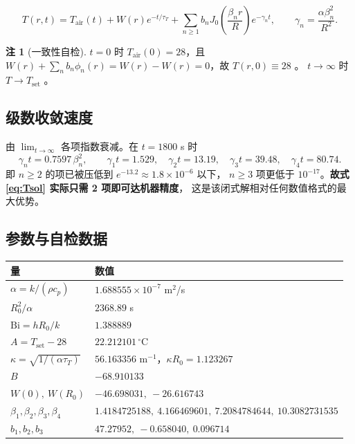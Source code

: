 \documentclass[11pt,a4paper]{article}
\theoremstyle{definition}
\newtheorem{remark}{注}
\begin{document}
\begin{equation}
\boxed{\;
T(r,t)=T_{\mathrm{air}}(t)+W(r)e^{-t/\tau_T}
+\sum_{n\ge1}b_nJ_0\!\left(\frac{\beta_n r}{R}\right)e^{-\gamma_nt},
\qquad \gamma_n=\frac{\alpha\beta_n^2}{R^2}.
\;}
\label{eq:Tsol}
\end{equation}

\begin{remark}[一致性自检]
$t=0$ 时 $T_{\mathrm{air}}(0)=28$，且
$W(r)+\sum_nb_n\phi_n(r)=W(r)-W(r)=0$，故 $T(r,0)\equiv28$ \checkmark。
$t\to\infty$ 时 $T\to T_{\mathrm{set}}$ \checkmark。
\end{remark}

\subsection{级数收敛速度}

由 $\lim_{t\to\infty}$ 各项指数衰减。在 $t=1800$ s 时
\[
\gamma_nt=0.7597\,\beta_n^2,\qquad
\gamma_1t=1.529,\quad\gamma_2t=13.19,\quad\gamma_3t=39.48,\quad\gamma_4t=80.74 .
\]
即 $n\ge2$ 的项已被压低到 $e^{-13.2}\approx1.8\times10^{-6}$ 以下，
$n\ge3$ 项更低于 $10^{-17}$。\textbf{故式 \eqref{eq:Tsol} 实际只需 2 项即可达机器精度}，
这是该闭式解相对任何数值格式的最大优势。

\subsection{参数与自检数据}

\begin{center}
\small
\begin{tabular}{@{}ll@{}}
\toprule
量 & 数值 \\
\midrule
$\alpha=k/(\rho c_p)$ & $1.688555\times10^{-7}$ m$^2$/s \\
$R_0^2/\alpha$ & $2368.89$ s \\
$\mathrm{Bi}=hR_0/k$ & $1.388889$ \\
$A=T_{\mathrm{set}}-28$ & $22.212101\,^\circ$C \\
$\kappa=\sqrt{1/(\alpha\tau_T)}$ & $56.163356$ m$^{-1}$，$\kappa R_0=1.123267$ \\
$B$ & $-68.910133$ \\
$W(0),\ W(R_0)$ & $-46.698031,\ -26.616743$ \\
$\beta_1,\beta_2,\beta_3,\beta_4$ & $1.4184725188,\ 4.166469601,\ 7.2084784644,\ 10.3082731535$ \\
$b_1,b_2,b_3$ & $47.27952,\ -0.658040,\ 0.096714$ \\
\bottomrule
\end{tabular}
\end{center}
\end{document}
